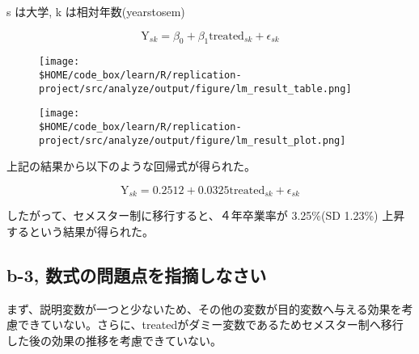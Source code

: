 \documentclass[a4paper]{jsarticle}
\begin{document}
s は大学, k は相対年数(yearstosem)

\begin{displaymath}
  \text{Y}_{sk} = \beta_0 + \beta_1 \text{treated}_{sk}  + \epsilon_{sk}
\end{displaymath}


\begin{figure}[H]
  \centering
  \texttt{[image: \\\$HOME/code\_box/learn/R/replication-project/src/analyze/output/figure/lm\_result\_table.png]}

\end{figure}

\begin{figure}[H]
  \centering
  \texttt{[image: \\\$HOME/code\_box/learn/R/replication-project/src/analyze/output/figure/lm\_result\_plot.png]}

\end{figure}

上記の結果から以下のような回帰式が得られた。

\begin{displaymath}
  \text{Y}_{sk} = 0.2512 + 0.0325 \text{treated}_{sk}  + \epsilon_{sk}
\end{displaymath}

したがって、セメスター制に移行すると、４年卒業率が 3.25\%(SD 1.23\%) 上昇するという結果が得られた。

\subsection*{b-3, 数式の問題点を指摘しなさい}

まず、説明変数が一つと少ないため、その他の変数が目的変数へ与える効果を考慮できていない。さらに、treatedがダミー変数であるためセメスター制へ移行した後の効果の推移を考慮できていない。
\end{document}
